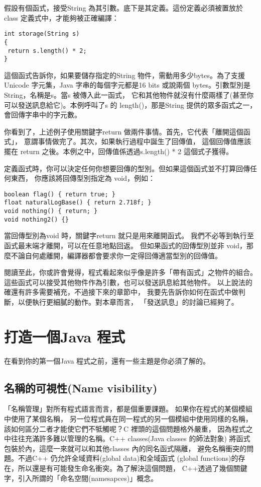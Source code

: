 假設有個函式，接受String 為其引數。底下是其定義。這份定義必須被置放於
class 定義式中，才能夠被正確編譯：

\begin{Verbatim}[frame=single]
int storage(String s) 
{
 return s.length() * 2;
}
\end{Verbatim}

這個函式告訴你，如果要儲存指定的String 物件，需動用多少bytes。為了支援
Unicode 字元集，Java 字串的每個字元都是16 bits 或說兩個
bytes。引數型別是String，名稱是s。當s 被傳入此一函式，
它和其他物件就沒有什麼兩樣了(甚至你可以發送訊息給它)。本例呼叫了s 的
length()，那是String 提供的眾多函式之一，會回傳字串中的字元數。

你看到了，上述例子使用關鍵字return 做兩件事情。首先，它代表「離開這個函式」，
意謂事情做完了。其次，如果執行過程中誕生了回傳值， 這個回傳值應該擺在
return 之後。本例之中，回傳值係透過s.length() * 2 這個式子獲得。

定義函式時，你可以決定任何你想要回傳的型別。但如果這個函式並不打算回傳任何東西，
你應該將回傳型別指定為 void，例如：

\begin{Verbatim}[frame=single]
boolean flag() { return true; }
float naturalLogBase() { return 2.718f; }
void nothing() { return; }
void nothing2() {}
\end{Verbatim}


當回傳型別為void 時，關鍵字return 就只是用來離開函式。
我們不必等到執行至函式最末端才離開，可以在任意地點回返。
但如果函式的回傳型別並非
void，那麼不論自何處離開，編譯器都會要求你一定得回傳適當型別的回傳值。

閱讀至此，你或許會覺得，程式看起來似乎像是許多「帶有函式」之物件的組合。
這些函式可以接受其他物件作為引數，也可以發送訊息給其他物件。
以上說法的確還有許多需要補充，不過接下來的章節中，
我要先告訴你如何在函式中做判斷，以便執行更細膩的動作。對本章而言，
「發送訊息」的討論已經夠了。
\section{打造一個Java 程式}
在看到你的第一個Java 程式之前，還有一些主題是你必須了解的。
\subsection{名稱的可視性(Name visibility)}

「名稱管理」對所有程式語言而言，都是個重要課題。
如果你在程式的某個模組中使用了某個名稱，
另一位程式員在同一程式的另一個模組中使用同樣的名稱，
該如何區分二者才能使它們不牴觸呢？C 裡頭的這個問題格外嚴重，
因為程式之中往往充滿許多難以管理的名稱。C++ classes(Java classes 的師法對象)
將函式包裝於內，這麼一來就可以和其他classes 內的同名函式隔離，
避免名稱衝突的問題。不過C++ 仍允許全域資料(global data)和全域函式
(global functions)的存在，所以還是有可能發生命名衝突。為了解決這個問題，
C++透過了幾個關鍵字，引入所謂的「命名空間(namesapces)」概念。

